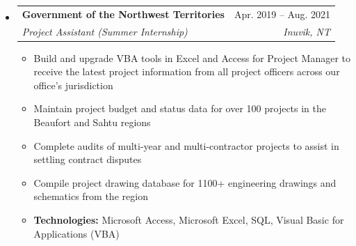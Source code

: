 \documentclass[letterpaper,12pt]{article}[leftmargin=*]
\makeatletter
\def \entryspacing {-0pt}
\newcommand{\resumeEntryStart}{\begin{itemize}[leftmargin=2.5mm]}
\newcommand{\resumeEntryEnd}{\end{itemize}\vspace{\entryspacing}}
\newcommand{\resumeItemListStart}{\begin{itemize}[leftmargin=4.5mm]}
\newcommand{\resumeItemListEnd}{\end{itemize}}
\newcommand{\resumeItem}[1]{
  \item\small{
    {#1 \vspace{-2pt}}
  }
}
\newcommand{\resumeEntryTSDL}[4]{
  \vspace{-1pt}\item[]
    \begin{tabularx}{0.97\textwidth}{X@{\hspace{60pt}}r}
      \textbf{\color{primary}#1} & {\firabook\color{accent}\small#2} \\
      \textit{\color{accent}\small#3} & \textit{\color{accent}\small#4} \\
    \end{tabularx}\vspace{-6pt}
}
\makeatother
\begin{document}

  \resumeEntryStart
    \resumeEntryTSDL
      {Government of the Northwest Territories}{Apr. 2019 -- Aug. 2021}
      {Project Assistant (Summer Internship)}{Inuvik, NT}
    \resumeItemListStart
      \resumeItem {Build and upgrade VBA tools in Excel and Access for Project Manager to receive the latest
      project information from all project officers across our office's jurisdiction}
      \resumeItem {Maintain project budget and status data for over 100 projects in the Beaufort and Sahtu regions}
      \resumeItem {Complete audits of multi-year and multi-contractor projects to assist in settling contract disputes}
      \resumeItem {Compile project drawing database for 1100+ engineering drawings and schematics from the region}
      \resumeItem {\textbf{Technologies:} Microsoft Access, Microsoft Excel, SQL, Visual Basic for Applications (VBA)}
    \resumeItemListEnd
  \resumeEntryEnd



\end{document}
